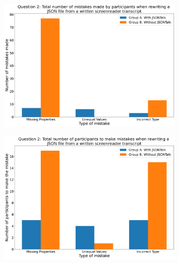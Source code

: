 \documentclass{l4proj}
\begin{document}
\begin{figure}
    \centering
    \begin{subfigure}{0.49\textwidth}
        \includegraphics[width=\textwidth]{dissertation/images/Evaluation results/Question 2_ Total number of mistakes made by participants when rewriting a _JSON file from a written screenreader transcript.png}
        \caption{}
        \label{fig:q2graph_mistakes}

    \end{subfigure}
    \begin{subfigure}{0.49\textwidth}
        
        \includegraphics[width=\textwidth]{dissertation/images/Evaluation results/Question 2_ Total number of participants to make mistakes when rewriting a _JSON file from a written screenreader transcript.png}
        \caption{}
        \label{fig:q2graph_participants}

    \end{subfigure}

    \caption{}
\end{figure}
\end{document}
